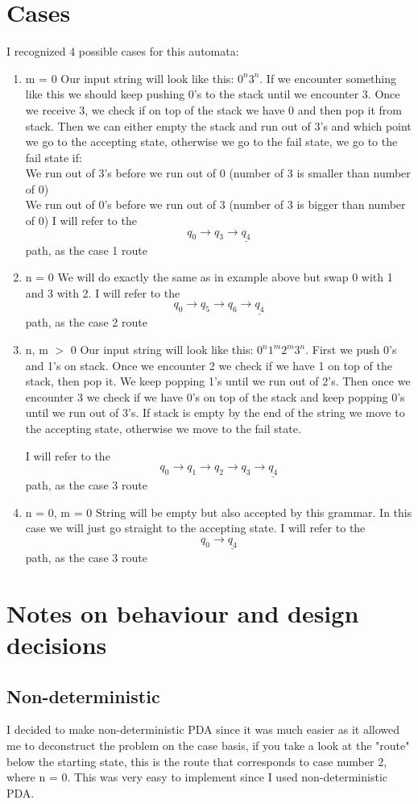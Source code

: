 \documentclass{report}[pt12]
\begin{document}
\section{Cases}
I recognized 4 possible cases for this automata:
\begin{enumerate}
\item m = 0
Our input string will look like this: $0^n3^n$. If we encounter something like this we should keep pushing 0's to the stack until we encounter 3. Once we receive 3, we check if on top of the stack we have 0 and then pop it from stack. Then we can either empty the stack and run out of 3's and which point we go to the accepting state, otherwise we go to the fail state, we go to the fail state if:
\\ We run out of 3's before we run out of 0 (number of 3 is smaller than number of 0)
\\ We run out of 0's before we run out of 3 (number of 3 is bigger than number of 0)
I will refer to the
\[ q_0 \rightarrow q_3 \rightarrow \underline{q_4} \]
path, as the case 1 route
\item n = 0
We will do exactly the same as in example above but swap 0 with 1 and 3 with 2.
I will refer to the
\[ q_0 \rightarrow q_5 \rightarrow q_6 \rightarrow \underline{q_4} \]
path, as the case 2 route
\item n, m $>$ 0
Our input string will look like this: $0^n1^m2^m3^n$.
First we push 0's and 1's on stack. Once we encounter 2 we check if we have 1 on top of the stack, then pop it. We keep popping 1's until we run out of 2's. Then once we encounter 3 we check if we have 0's on top of the stack and keep popping 0's until we run out of 3's. If stack is empty by the end of the string we move to the accepting state, otherwise we move to the fail state.

I will refer to the
\[ q_0 \rightarrow q_1 \rightarrow q_2 \rightarrow q_3 \rightarrow \underline{q_4} \]
path, as the case 3 route
\item n = 0, m = 0
String will be empty but also accepted by this grammar. In this case we will just go straight to the accepting state.
I will refer to the
\[ q_0 \rightarrow \underline{q_4} \]
path, as the case 3 route
\end{enumerate}

\section{Notes on behaviour and design decisions}
\subsection{Non-deterministic}
I decided to make non-deterministic PDA since it was much easier as it allowed me to deconstruct the problem on the case basis, if you take a look at the "route" below the starting state, this is the route that corresponds to case number 2, where n = 0. This was very easy to implement since I used non-deterministic PDA.
\end{document}
